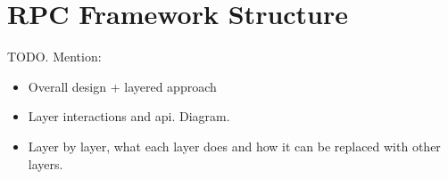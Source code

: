 \section{RPC Framework Structure} %
\label{sec:rpc_framework_structure}

TODO. Mention:
\begin{itemize}
	\item Overall design + layered approach
	\item Layer interactions and api. Diagram.
	\item Layer by layer, what each layer does and how it can be replaced with other layers.
\end{itemize}

